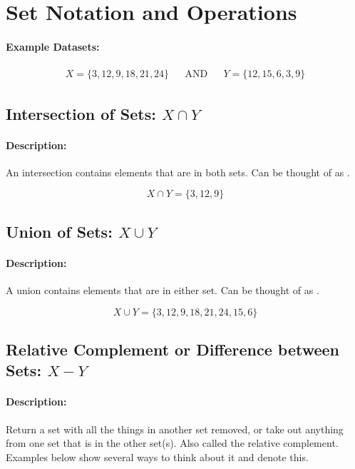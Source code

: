 \documentclass[12pt]{article}
\begin{document}
\section*{Set Notation and Operations}

\paragraph{Example Datasets:}
\begin{align*}
  X = \{3, 12, 9, 18, 21, 24\} && \text{AND} &&
  Y = \{12, 15, 6, 3, 9\}
\end{align*}
\subsection{Intersection of Sets: $X \cap Y$}
\paragraph{Description:} An intersection contains elements that are in both sets. Can be thought of as .

\begin{equation}
  X \cap Y = \{3, 12, 9\}
\end{equation}%
\subsection{Union of Sets: $X \cup Y$}
\paragraph{Description:} A union contains elements that are in either set. Can be thought of as .

\begin{equation}
  X \cup Y = \{3, 12, 9, 18, 21, 24, 15, 6\}
\end{equation}%
\subsection{Relative Complement or Difference between Sets: $X - Y$}
\paragraph{Description:} Return a set with all the things in another set removed, or take out anything from one set that is in the other set(s). Also called the relative complement. Examples below show several ways to think about it and denote this. %
\end{document}
